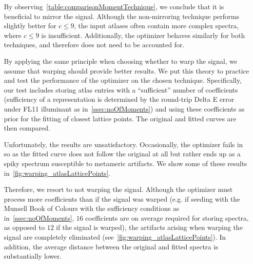 By observing~\cref{table:comparisonMomentTechnique}, we conclude that it is beneficial to mirror the signal. Although the non-mirroring technique performs slightly better for $c \le 9$, the input atlases often contain more complex spectra, where $c \le 9$ is insufficient. Additionally, the optimizer behaves similarly for both techniques, and therefore does not need to be accounted for.

By applying the same principle when choosing whether to warp the signal, we assume that warping should provide better results. We put this theory to practice and test the performance of the optimizer on the chosen technique. Specifically, our test includes storing atlas entries with a ``sufficient'' number of coefficients (sufficiency of a representation is determined by the round-trip Delta E error under FL11 illuminant as in~\cref{ssec:noOfMoments}) and using these coefficients as prior for the fitting of closest lattice points. The original and fitted curves are then compared.

Unfortunately, the results are unsatisfactory. Occasionally, the optimizer fails in so as the fitted curve does not follow the original at all but rather ends up as a spiky spectrum susceptible to metameric artifacts. We show some of these results in~\cref{fig:warping_atlasLatticePoints}.

Therefore, we resort to not warping the signal. Although the optimizer must process more coefficients than if the signal was warped (e.g. if seeding with the Munsell Book of Colours with the sufficiency conditions as in~\cref{ssec:noOfMoments}, $16$ coefficients are on average required for storing spectra, as opposed to $12$ if the signal is warped), the artifacts arising when warping the signal are completely eliminated (see~\cref{fig:warping_atlasLatticePoints}). In addition, the average distance between the original and fitted spectra is substantially lower.

